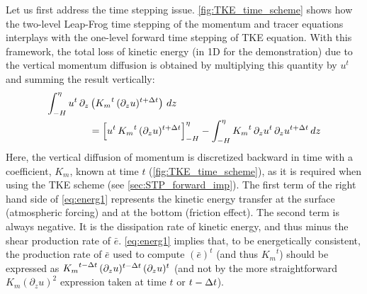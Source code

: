 \documentclass[../tex_main/NEMO_manual]{subfiles}
\begin{document}
Let us first address the time stepping issue. \autoref{fig:TKE_time_scheme} shows how
the two-level Leap-Frog time stepping of the momentum and tracer equations interplays with
the one-level forward time stepping of TKE equation.
With this framework, the total loss of kinetic energy (in 1D for the demonstration) due to
the vertical momentum diffusion is obtained by multiplying this quantity by $u^t$ and
summing the result vertically:   
\begin{equation} \label{eq:energ1}
\begin{split}
\int_{-H}^{\eta}  u^t \,\partial_z &\left( {K_m}^t \,(\partial_z u)^{t+\Delta t}  \right) \,dz   \\
&= \Bigl[  u^t \,{K_m}^t \,(\partial_z u)^{t+\Delta t} \Bigr]_{-H}^{\eta}          
 - \int_{-H}^{\eta}{ {K_m}^t \,\partial_z{u^t} \,\partial_z u^{t+\Delta t} \,dz }
\end{split}
\end{equation}
Here, the vertical diffusion of momentum is discretized backward in time with a coefficient, $K_m$,
known at time $t$ (\autoref{fig:TKE_time_scheme}), as it is required when using the TKE scheme
(see \autoref{sec:STP_forward_imp}).
The first term of the right hand side of \autoref{eq:energ1} represents the kinetic energy transfer at
the surface (atmospheric forcing) and at the bottom (friction effect).
The second term is always negative.
It is the dissipation rate of kinetic energy, and thus minus the shear production rate of $\bar{e}$.
\autoref{eq:energ1} implies that, to be energetically consistent,
the production rate of $\bar{e}$ used to compute $(\bar{e})^t$ (and thus ${K_m}^t$) should be expressed as
${K_m}^{t-\Delta t}\,(\partial_z u)^{t-\Delta t} \,(\partial_z u)^t$
(and not by the more straightforward $K_m \left( \partial_z u \right)^2$ expression taken at time $t$ or $t-\Delta t$).
\end{document}

